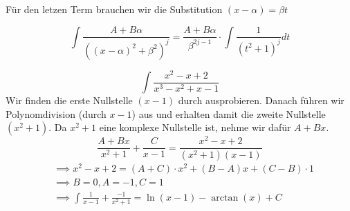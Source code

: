Für den letzen Term brauchen wir die Substitution $(x - \alpha) = \beta t$

$$\int \frac{A + B \alpha}{((x - \alpha)^2 + \beta^2)^j} = \frac{A + B \alpha}{\beta^{2j-1}} \cdot \int \frac{1}{(t^2 + 1)^j}dt$$


\columnbreak


\Bsp $$\int \frac{x^2 -x + 2}{x^3 -x^2 +x -1}$$
Wir finden die erste Nullstelle $(x - 1)$ durch ausprobieren. Danach führen wir Polynomdivision 
(durch $x - 1$) aus und erhalten damit die zweite Nullstelle $(x^2 + 1)$. Da $x^2 + 1$ eine komplexe 
Nullstelle ist, nehme wir dafür $A + Bx$.
$$\frac{A + Bx}{x^2 + 1} + \frac{C}{x-1} = \frac{x^2 - x + 2}{(x^2 + 1)(x-1)}$$
\begin{align*}
    &\implies x^2 -x + 2 = (A+C) \cdot x^2 + (B-A)x + (C-B)\cdot 1 \\
    &\implies B=0, A = -1, C=1 \\
    &\implies \int \frac{1}{x-1} + \frac{-1}{x^2 + 1} = \ln(x-1) - \arctan(x) + C
\end{align*}
